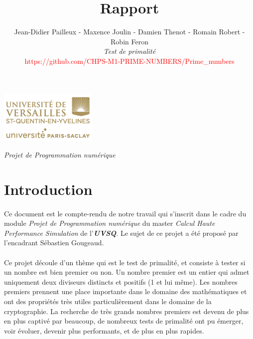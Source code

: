 

\title{\vspace{\fill}\textbf{\Huge Rapport}}
\author{Jean-Didier Pailleux - Maxence Joulin - Damien Thenot - Romain Robert - Robin Feron 
	\vspace{2em}\\
	\textit{Test de primalité}\\
	\textcolor{red}{https://github.com/CHPS-M1-PRIME-NUMBERS/Prime\_numbers}
	\vspace{2em}
}


\clearpage
\maketitle\vspace{13em}
\begin{center}\includegraphics[scale=0.7]{logo.png}\end{center}
\begin{flushright}\textit{Projet de Programmation numérique}\end{flushright}
\newpage
\tableofcontents
\newpage\clearpage{}

	\section{Introduction}
	\paragraph{}Ce document est le compte-rendu de notre travail qui s'inscrit dans le cadre du module \textit{Projet de Programmation numérique} du master \textit{Calcul Haute Performance Simulation} de l'\textit{\textbf{UVSQ}}. Le sujet de ce projet a été proposé par l'encadrant Sébastien Gougeaud.
	
	\paragraph{}Ce projet découle d'un thème qui est le test de primalité, et consiste à tester si un nombre est bien premier ou non. Un nombre premier est un entier qui admet uniquement deux diviseurs distincts et positifs (1 et lui même). 
	Les nombres premiers prennent une place importante dans le domaine des mathématiques et ont des propriétés très utiles particulièrement dans le domaine de la cryptographie. La recherche de très grands nombres premiers est devenu de plus en plus captivé par beaucoup, de nombreux tests de primalité ont pu émerger, voir évoluer, devenir plus performants, et de plus en plus rapides.
	

